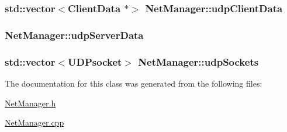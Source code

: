 \hypertarget{classNetManager_a687d70a4e199c2cbe4cb955a2cd94b04}{
\subsubsection[{udp\-Client\-Data}]{\setlength{\rightskip}{0pt plus 5cm}std\-::vector$<${\bf Client\-Data} $\ast$$>$ Net\-Manager\-::udp\-Client\-Data}}\label{classNetManager_a687d70a4e199c2cbe4cb955a2cd94b04}
\hypertarget{classNetManager_a7db7fafed8aabbe088aa12c731842efd}{
\subsubsection[{udp\-Server\-Data}]{ Net\-Manager\-::udp\-Server\-Data}}\label{classNetManager_a7db7fafed8aabbe088aa12c731842efd}
\hypertarget{classNetManager_aa99d99b6fa90707d9101c4e1a1835018}{
\subsubsection[{udp\-Sockets}]{\setlength{\rightskip}{0pt plus 5cm}std\-::vector$<$U\-D\-Psocket$>$ Net\-Manager\-::udp\-Sockets\hspace{0.3cm}{\ttfamily [private]}}}\label{classNetManager_aa99d99b6fa90707d9101c4e1a1835018}


The documentation for this class was generated from the following files\-:\begin{DoxyCompactItemize}
\item 
\hyperlink{NetManager_8h}{Net\-Manager.\-h}\item 
\hyperlink{NetManager_8cpp}{Net\-Manager.\-cpp}\end{DoxyCompactItemize}
